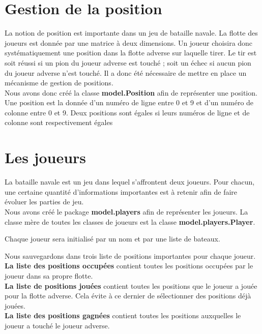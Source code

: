 \documentclass[a4paper, 12pt]{report}
\begin{document}
    \section{Gestion de la position}
    La notion de position est importante dans un jeu de bataille navale. La flotte des joueurs est donnée par une matrice
    à deux dimensions. Un joueur choisira donc systématiquement une position dans la flotte adverse sur laquelle tirer.
    Le tir est soit réussi si un pion du joueur adverse est touché ; soit un échec si aucun pion du joueur adverse n'est
    touché. Il a donc été nécessaire de mettre en place un mécanisme de gestion de positions. \\

    Nous avons donc créé la classe \textbf{model.Position} afin de représenter une position. Une position est la donnée
    d'un numéro de ligne entre 0 et 9 et d'un numéro de colonne entre 0 et 9.
    Deux positions sont égales si leurs numéros de ligne et de colonne sont respectivement égales

    \section{Les joueurs}
    La bataille navale est un jeu dans lequel s'affrontent deux joueurs. Pour chacun, une certaine quantité d'informations
    importantes est à retenir afin de faire évoluer les parties de jeu. \\

    Nous avons créé le package \textbf{model.players} afin de représenter les joueurs. La classe mère de toutes les
    classes de joueurs est la classe \textbf{model.players.Player}.

    Chaque joueur sera initialisé par un nom et par une liste de bateaux.

    Nous sauvegardons dans trois liste de positions importantes pour chaque joueur.\\
    \textbf{La liste des positions occupées} contient toutes les positions occupées par le joueur dans sa propre flotte.\\
    \textbf{La liste de positions jouées} contient toutes les positions que le joueur a jouée pour la flotte adverse.
    Cela évite à ce dernier de sélectionner des positions déjà jouées. \\
    \textbf{La liste des positions gagnées} contient toutes les positions auxquelles le joueur a touché le joueur adverse.\\
\end{document}
